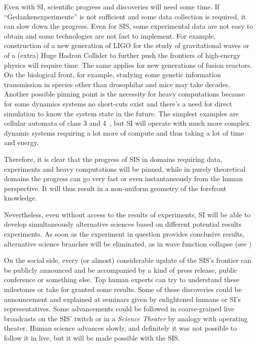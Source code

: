\documentclass[a4paper,11pt]{article}
\begin{document}
Even with SI, scientific progress and discoveries will need some time. If ``Gedankenexperimente'' is not sufficient and some data collection is required, it can slow down the progress. Even for SIS, some experimental data are not easy to obtain and some technologies are not fast to implement. For example, construction of a new generation of LIGO for the study of gravitational waves  or of a (extra) Huge Hadron Collider to further push the frontiers of high-energy physics will require time. The same applies for new generations of fusion reactors. On the biological front, for example, studying some genetic information transmission in species other than drosophilas and mice may take decades. Another possible pinning point is the necessity for heavy computations because for some dynamics systems no short-cuts exist and there's a need for direct simulation to know the system state in the future. The simplest examples are cellular automata of class 3 and 4~\parencite{Wolfram1984CA}, but SI will operate with much more complex dynamic systems requiring a lot more of compute and thus taking a lot of time and energy.

Therefore, it is clear that the progress of SIS in domains requiring data, experiments and heavy computations will be pinned, while in purely theoretical domains the progress can go very fast or even instantaneously from the human perspective. It will thus result in a non-uniform geometry of the forefront knowledge. 

Nevertheless, even without access to the results of experiments, SI will be able to develop simultaneously alternative sciences based on different potential results experiments. As soon as the experiment in question provides conclusive results, alternative science branches will be eliminated, as in wave function collapse (see )

On the social side, every (or almost) considerable update of the SIS's frontier can be publicly announced and be accompanied by a kind of press release, public conference or something else. Top human experts can try to understand these milestones or take for granted some results. Some of these discoveries could be announcement and explained at seminars given by enlightened humans or SI's representatives. Some advancements could be followed in coarse-grained live broadcasts on the SIS' twitch or in a \emph{Science Theater} by analogy with operating theater. Human science advances slowly, and definitely it was not possible to follow it in live, but it will be made possible with the SIS.
\end{document}
